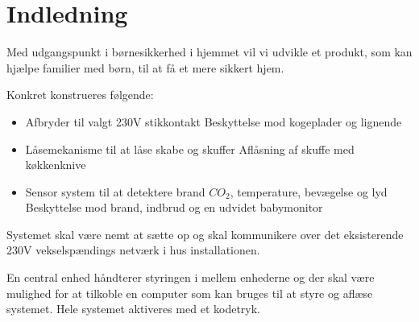 \chapter{Indledning}

Med udgangspunkt i børnesikkerhed i hjemmet vil vi udvikle et produkt, som kan hjælpe familier med børn, til at få et mere sikkert hjem.

Konkret konstrueres følgende:

\begin{itemize}
\item Afbryder til valgt 230V stikkontakt
\subitem Beskyttelse mod kogeplader og lignende
\item Låsemekanisme til at låse skabe og skuffer
\subitem Aflåsning af skuffe med køkkenknive
\item Sensor system til at detektere brand $CO_2$, temperature, bevægelse og lyd
\subitem Beskyttelse mod brand, indbrud og en udvidet babymonitor
\end{itemize}

Systemet skal være nemt at sætte op og skal kommunikere over det eksisterende 230V vekselspændings netværk i hus installationen.

En central enhed håndterer styringen i mellem enhederne og der skal være mulighed for at tilkoble en computer som kan bruges til at styre og aflæse systemet. Hele systemet aktiveres med et kodetryk.
